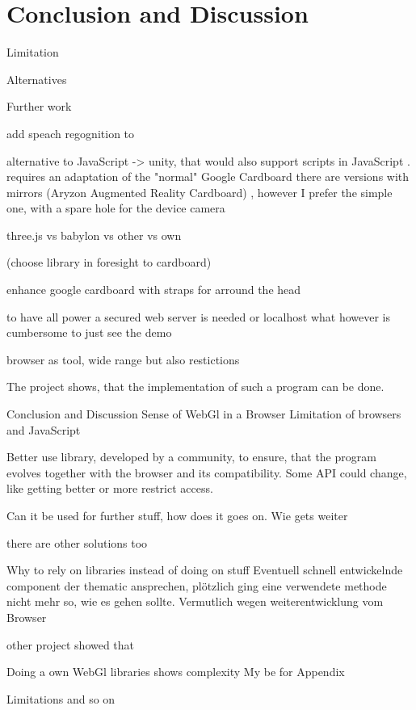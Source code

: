 \chapter{Conclusion and Discussion }

Limitation

Alternatives

Further work

add speach regognition to 





alternative to JavaScript -> unity, that would also support scripts in JavaScript
.
requires an adaptation of the "normal" Google Cardboard
there are versions with mirrors (Aryzon Augmented Reality Cardboard) , however I prefer the simple one, with a spare hole for the device camera

three.js vs babylon vs other vs own

(choose library in foresight to cardboard)


enhance google cardboard with straps for arround the head

to have all power a secured web server is needed or localhost what however is cumbersome to just see the demo

browser as tool, wide range but also restictions




The project shows, that the implementation of such a program can be done.



Conclusion and Discussion 
Sense of WebGl in a Browser
Limitation of browsers and JavaScript




Better use library, developed by a community, to ensure, that the program evolves together with the browser and its compatibility. Some API could change, like getting better or more restrict access.

Can it be used for further stuff, how does it goes on. Wie gets weiter


there are other solutions too

 
Why to rely on libraries instead of doing on stuff
Eventuell schnell entwickelnde component der thematic ansprechen, plötzlich ging eine verwendete methode nicht mehr so, wie es gehen sollte. Vermutlich wegen weiterentwicklung vom Browser

other project showed that





Doing a own WebGl libraries shows complexity
My be for Appendix


Limitations and so on
